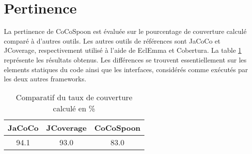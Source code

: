 \section{Pertinence}

La pertinence de CoCoSpoon est évaluée sur le pourcentage de couverture calculé comparé à d'autres outils. Les autres outils de références sont JaCoCo et JCoverage, respectivement utilisé à l'aide de EclEmma et Cobertura. La table \ref{evaluation_pertinence} représente les résultats obtenus. Les différences se trouvent essentiellement sur les elements statiques du code ainsi que les interfaces, considérés comme exécutés par les deux autres frameworks. 

\begin{table}[H]
\centering
\begin{tabular}{|c|c|c|}
  \hline
  JaCoCo & JCoverage & CoCoSpoon \\
  \hline
  94.1 & 93.0 & 83.0 \\
  \hline
\end{tabular}

\label{evaluation_pertinence}
\caption{Comparatif du taux de couverture calculé en \%}
\end{table}